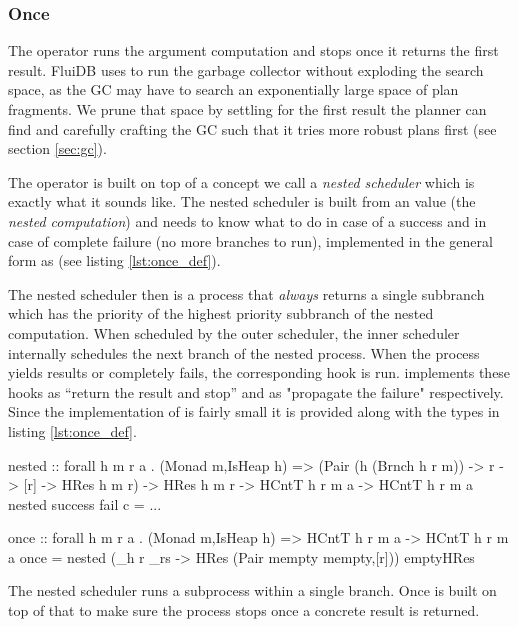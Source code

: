 \subsubsection{Once}

The  operator runs the argument computation and stops once
it returns the first result. FluiDB uses  to run the
garbage collector without exploding the search space, as the GC may
have to search an exponentially large space of plan fragments. We
prune that space by settling for the first result the planner can find
and carefully crafting the GC such that it tries more robust plans
first (see section \ref{sec:gc}).

The  operator is built on top of a concept we call a
\emph{nested scheduler} which is exactly what it sounds like.  The
nested scheduler is built from an  value (the \emph{nested
  computation}) and needs to know what to do in case of a success and
in case of complete failure (no more branches to run), implemented in
the general form as  (see listing \ref{lst:once_def}).

The nested scheduler then is a process that \emph{always} returns a
single subbranch which has the priority of the highest priority
subbranch of the nested computation. When scheduled by the outer
scheduler, the inner scheduler internally schedules the next branch of
the nested process. When the process yields results or completely
fails, the corresponding hook is run.  implements these
hooks as ``return the result and stop'' and as "propagate the failure"
respectively. Since the implementation of  is fairly small
it is provided along with the types in listing \ref{lst:once_def}.

\begin{code}
\begin{haskellcode}
nested
  :: forall h m r a .
  (Monad m,IsHeap h)
  => (Pair (h (Brnch h r m)) -> r -> [r] -> HRes h m r)
  -> HRes h m r
  -> HCntT h r m a
  -> HCntT h r m a
nested success fail c = ...

once :: forall h m r a . (Monad m,IsHeap h) => HCntT h r m a -> HCntT h r m a
once = nested (\_h r _rs -> HRes (Pair mempty mempty,[r])) emptyHRes
\end{haskellcode}

\caption{\label{lst:once_def}The nested scheduler runs a subprocess within a single branch. Once is built on top of that to make sure the process stops once a concrete result is returned.}
\end{code}

